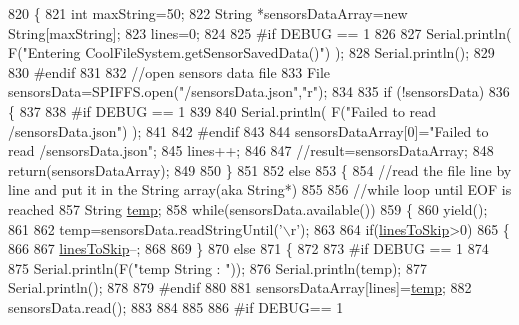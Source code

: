 \begin{DoxyCode}
820 \{
821     \textcolor{keywordtype}{int} maxString=50;
822     String *sensorsDataArray=\textcolor{keyword}{new} String[maxString];
823     lines=0;
824 
825 \textcolor{preprocessor}{#if DEBUG == 1 }
826 
827     Serial.println( F(\textcolor{stringliteral}{"Entering CoolFileSystem.getSensorSavedData()"}) );
828     Serial.println();
829 
830 \textcolor{preprocessor}{#endif}
831 
832     \textcolor{comment}{//open sensors data file}
833     File sensorsData=SPIFFS.open(\textcolor{stringliteral}{"/sensorsData.json"},\textcolor{stringliteral}{"r"});
834     
835     \textcolor{keywordflow}{if} (!sensorsData)
836     \{
837 
838 \textcolor{preprocessor}{    #if DEBUG == 1 }
839 
840         Serial.println( F(\textcolor{stringliteral}{"Failed to read /sensorsData.json"}) );
841 
842 \textcolor{preprocessor}{    #endif}
843          
844         sensorsDataArray[0]=\textcolor{stringliteral}{"Failed to read /sensorsData.json"};
845         lines++;
846 
847         \textcolor{comment}{//result=sensorsDataArray;}
848         \textcolor{keywordflow}{return}(sensorsDataArray);
849 
850     \}
851 
852     \textcolor{keywordflow}{else}
853     \{
854         \textcolor{comment}{//read the file line by line and put it in the String array(aka String*)        }
855 
856         \textcolor{comment}{//while loop until EOF is reached}
857         String \hyperlink{_irene3000_8h_a5905d48604152cf57aa6bfa087b49173}{temp};
858         \textcolor{keywordflow}{while}(sensorsData.available())
859         \{
860             yield();
861             
862             temp=sensorsData.readStringUntil(\textcolor{charliteral}{'\(\backslash\)r'});
863 
864             \textcolor{keywordflow}{if}(\hyperlink{class_cool_file_system_a84fdb6057e534b395512463daa28ea3c}{linesToSkip}>0)
865             \{
866 
867                 \hyperlink{class_cool_file_system_a84fdb6057e534b395512463daa28ea3c}{linesToSkip}--;
868         
869             \}
870             \textcolor{keywordflow}{else}
871             \{
872 
873 \textcolor{preprocessor}{            #if DEBUG == 1}
874 
875                 Serial.println(F(\textcolor{stringliteral}{"temp String : "}));
876                 Serial.println(temp);
877                 Serial.println();
878             
879 \textcolor{preprocessor}{            #endif}
880             
881                 sensorsDataArray[lines]=\hyperlink{_irene3000_8h_a5905d48604152cf57aa6bfa087b49173}{temp};
882                 sensorsData.read();
883             
884             
885         
886 \textcolor{preprocessor}{            #if DEBUG== 1}

\end{DoxyCode}
